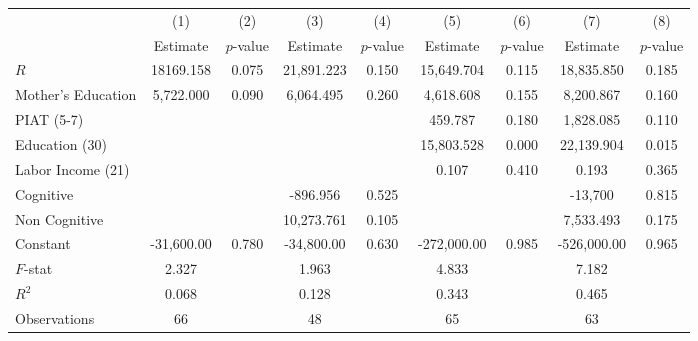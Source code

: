 \begin{tabular}{lcccccccc} \toprule
 & (1) & (2) & (3) & (4) & (5) & (6) & (7) & (8) \\ 
 & Estimate  & $p$-value  & Estimate  & $p$-value  & Estimate  & $p$-value  & Estimate  & $p$-value  \\  \midrule
$R$ & 18169.158 &     0.075 & 21,891.223 &     0.150 & 15,649.704 &     0.115 & 18,835.850 &     0.185 \\  
Mother's Education &  5,722.000 &     0.090 &  6,064.495 &     0.260 &  4,618.608 &     0.155 &  8,200.867 &     0.160 \\  
PIAT (5-7) &         &         &         &         &   459.787 &     0.180 &  1,828.085 &     0.110 \\  
Education (30) &         &         &         &         & 15,803.528 &     0.000 & 22,139.904 &     0.015 \\  
Labor Income (21) &         &         &         &         &     0.107 &     0.410 &     0.193 &     0.365 \\  
Cognitive &         &         &  -896.956 &     0.525 &         &         & -13,700 &     0.815 \\  
Non Cognitive &         &         & 10,273.761 &     0.105 &         &         &  7,533.493 &     0.175 \\  
Constant & -31,600.00 &     0.780 & -34,800.00 &     0.630 & -272,000.00 &     0.985 & -526,000.00 &     0.965 \\  \midrule
$F$-stat &     2.327 &         &     1.963 &         &     4.833 &         &     7.182 &         \\
$R^2$ &     0.068 &         &     0.128 &         &     0.343 &         &     0.465 &         \\  
Observations &    66 &         &    48 &         &    65 &         &    63 &         \\  
\bottomrule \end{tabular}
